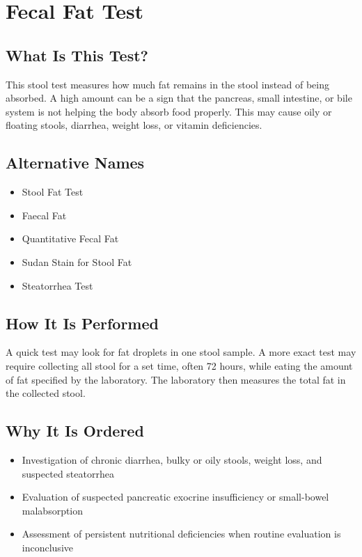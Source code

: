 \chapter{Fecal Fat Test}

\section*{What Is This Test?}
This stool test measures how much fat remains in the stool instead of being absorbed. A high amount can be a sign that the pancreas, small intestine, or bile system is not helping the body absorb food properly. This may cause oily or floating stools, diarrhea, weight loss, or vitamin deficiencies.

\section*{Alternative Names}
\begin{itemize}
  \item Stool Fat Test
  \item Faecal Fat
  \item Quantitative Fecal Fat
  \item Sudan Stain for Stool Fat
  \item Steatorrhea Test
\end{itemize}
\section*{How It Is Performed}
A quick test may look for fat droplets in one stool sample. A more exact test may require collecting all stool for a set time, often 72 hours, while eating the amount of fat specified by the laboratory. The laboratory then measures the total fat in the collected stool.

\section*{Why It Is Ordered}
\begin{itemize}
  \item Investigation of chronic diarrhea, bulky or oily stools, weight loss, and suspected steatorrhea
  \item Evaluation of suspected pancreatic exocrine insufficiency or small-bowel malabsorption
  \item Assessment of persistent nutritional deficiencies when routine evaluation is inconclusive
\end{itemize}

